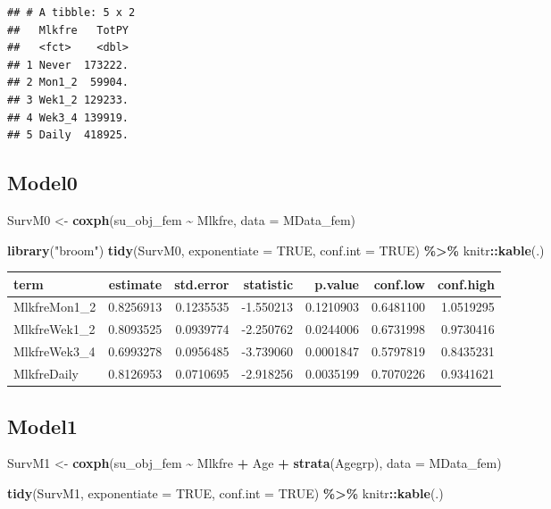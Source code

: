 \documentclass[
]{article}
\newenvironment{Shaded}{\begin{snugshade}}{\end{snugshade}}
\newcommand{\DataTypeTok}[1]{\textcolor[rgb]{0.13,0.29,0.53}{#1}}
\newcommand{\KeywordTok}[1]{\textcolor[rgb]{0.13,0.29,0.53}{\textbf{#1}}}
\newcommand{\NormalTok}[1]{#1}
\newcommand{\OperatorTok}[1]{\textcolor[rgb]{0.81,0.36,0.00}{\textbf{#1}}}
\newcommand{\OtherTok}[1]{\textcolor[rgb]{0.56,0.35,0.01}{#1}}
\newcommand{\StringTok}[1]{\textcolor[rgb]{0.31,0.60,0.02}{#1}}
\begin{document}
\begin{verbatim}
## # A tibble: 5 x 2
##   Mlkfre   TotPY
##   <fct>    <dbl>
## 1 Never  173222.
## 2 Mon1_2  59904.
## 3 Wek1_2 129233.
## 4 Wek3_4 139919.
## 5 Daily  418925.
\end{verbatim}

\hypertarget{model0-2}{%
\subsection{Model0}\label{model0-2}}

\begin{Shaded}
\begin{Highlighting}[]
\NormalTok{SurvM0 \textless{}{-}}\StringTok{  }\KeywordTok{coxph}\NormalTok{(su\_obj\_fem }\OperatorTok{\textasciitilde{}}\StringTok{ }\NormalTok{Mlkfre, }
                 \DataTypeTok{data =}\NormalTok{ MData\_fem)}

\KeywordTok{library}\NormalTok{(}\StringTok{"broom"}\NormalTok{)}
\KeywordTok{tidy}\NormalTok{(SurvM0, }\DataTypeTok{exponentiate =} \OtherTok{TRUE}\NormalTok{, }\DataTypeTok{conf.int =} \OtherTok{TRUE}\NormalTok{) }\OperatorTok{\%\textgreater{}\%}\StringTok{ }
\StringTok{  }\NormalTok{knitr}\OperatorTok{::}\KeywordTok{kable}\NormalTok{(.)}
\end{Highlighting}
\end{Shaded}

\begin{longtable}[]{@{}lrrrrrr@{}}
\toprule
term & estimate & std.error & statistic & p.value & conf.low &
conf.high\tabularnewline
\midrule
\endhead
MlkfreMon1\_2 & 0.8256913 & 0.1235535 & -1.550213 & 0.1210903 &
0.6481100 & 1.0519295\tabularnewline
MlkfreWek1\_2 & 0.8093525 & 0.0939774 & -2.250762 & 0.0244006 &
0.6731998 & 0.9730416\tabularnewline
MlkfreWek3\_4 & 0.6993278 & 0.0956485 & -3.739060 & 0.0001847 &
0.5797819 & 0.8435231\tabularnewline
MlkfreDaily & 0.8126953 & 0.0710695 & -2.918256 & 0.0035199 & 0.7070226
& 0.9341621\tabularnewline
\bottomrule
\end{longtable}

\hypertarget{model1-2}{%
\subsection{Model1}\label{model1-2}}

\begin{Shaded}
\begin{Highlighting}[]
\NormalTok{SurvM1 \textless{}{-}}\StringTok{  }\KeywordTok{coxph}\NormalTok{(su\_obj\_fem }\OperatorTok{\textasciitilde{}}\StringTok{ }\NormalTok{Mlkfre }\OperatorTok{+}\StringTok{ }\NormalTok{Age }\OperatorTok{+}\StringTok{ }\KeywordTok{strata}\NormalTok{(Agegrp), }
                 \DataTypeTok{data =}\NormalTok{ MData\_fem)}

\KeywordTok{tidy}\NormalTok{(SurvM1, }\DataTypeTok{exponentiate =} \OtherTok{TRUE}\NormalTok{, }\DataTypeTok{conf.int =} \OtherTok{TRUE}\NormalTok{) }\OperatorTok{\%\textgreater{}\%}\StringTok{ }
\StringTok{  }\NormalTok{knitr}\OperatorTok{::}\KeywordTok{kable}\NormalTok{(.)}
\end{Highlighting}
\end{Shaded}
\end{document}
